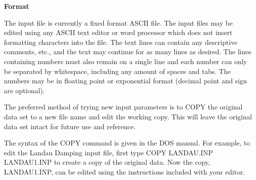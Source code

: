 \begin{section}
\begin{subsection}
{\bf Format}

   The input file is currently a fixed format ASCII file.  The input files may
   be edited using any ASCII text editor or word processor which does not
   insert formatting characters into the file.  The text lines can contain any
   descriptive comments, etc., and the text may continue for as many lines as
   desired.  The lines containing numbers must also remain on a single line and
   each number can only be separated by whitespace, including any amount of
   spaces and tabs.  The numbers may be in floating point or exponential format
   (decimal point and sign are optional).
\vspace{.1in}

\noindent
   The preferred method of trying new input parameters is to COPY the original
   data set to a new file name and edit the working copy.  This will leave the
   original data set intact for future use and reference.
\vspace{.2in}

\noindent
   The syntax of the COPY command is given in the DOS manual.  For example, to
   edit the Landau Damping input file, first type 
   {\sc COPY LANDAU.INP LANDAU1.INP} to create a copy of the original 
   data.  Now the copy, LANDAU1.INP, can be
   edited using the instructions included with your editor.
\end{subsection}
\end{section}

